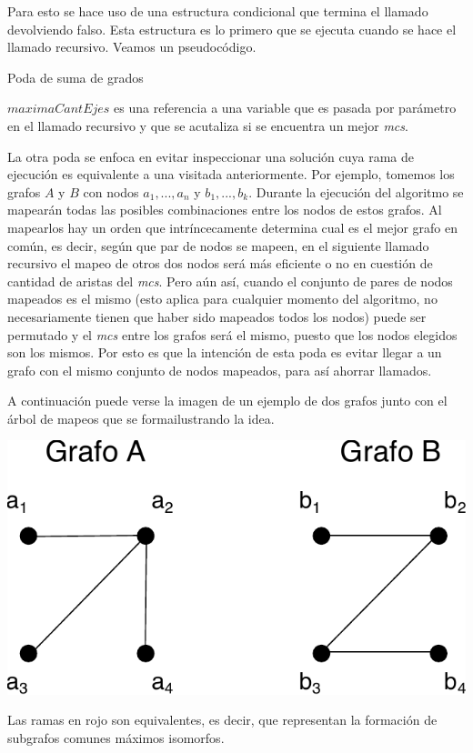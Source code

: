 Para esto se hace uso de una estructura condicional que termina el llamado
devolviendo falso. Esta estructura es lo primero que se ejecuta cuando se hace
el llamado recursivo. Veamos un pseudocódigo.

\begin{algorithm}
    \caption{Poda de suma de grados}
     {
    }
\end{algorithm}

$maximaCantEjes$ es una referencia a una variable que es pasada por parámetro
en el llamado recursivo y que se acutaliza si se encuentra un mejor
\textit{mcs}.

La otra poda se enfoca en evitar inspeccionar una solución cuya rama de
ejecución es equivalente a una visitada anteriormente. Por ejemplo, tomemos
los grafos $A$ y $B$ con nodos $a_1, ..., a_n$ y $b_1, ..., b_k$. Durante la
ejecución del algoritmo se mapearán todas las posibles combinaciones entre
los nodos de estos grafos. Al mapearlos hay un orden que intríncecamente
determina cual es el mejor grafo en común, es decir, según que par de nodos
se mapeen, en el siguiente llamado recursivo el mapeo de otros dos nodos
será más eficiente o no en cuestión de cantidad de aristas del \textit{mcs}.
Pero aún así, cuando el conjunto de pares de nodos mapeados es el mismo (esto
aplica para cualquier momento del algoritmo, no necesariamente tienen que
haber sido mapeados todos los nodos) puede ser permutado y el \textit{mcs}
entre los grafos será el mismo, puesto que los nodos elegidos son los mismos.
Por esto es que la intención de esta poda es evitar llegar a un grafo con el
mismo conjunto de nodos mapeados, para así ahorrar llamados.

A continuación puede verse la imagen de un ejemplo de dos grafos junto con el
árbol de mapeos que se formailustrando la idea.

\begin{center}
\includegraphics[width=.45\textwidth]{imagenes/ex2_grafos.pdf}
\end{center}

Las ramas en rojo son equivalentes, es decir, que representan la formación de
subgrafos comunes máximos isomorfos.


